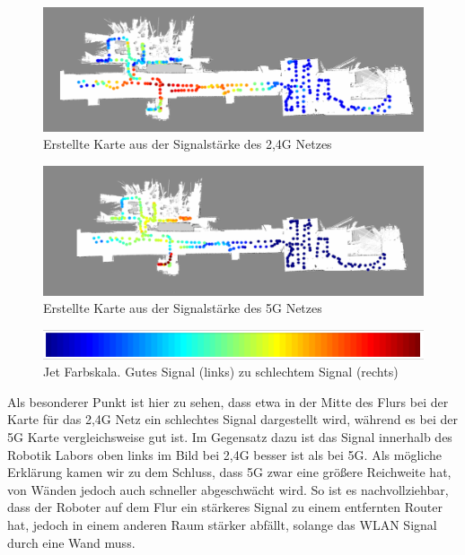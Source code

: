 \documentclass{scrartcl}%
\begin{document}
\begin{figure}[h!]
	\centering
	\includegraphics[width=\textwidth]{bilder/wlan-heatmap-2G4.png}
	\caption{Erstellte Karte aus der Signalstärke des 2,4G Netzes}
	\label{2g4}
\end{figure}

\begin{figure}[h!]
	\centering
	\includegraphics[width=\textwidth]{bilder/wlan-heatmap-5G.png}
	\caption{Erstellte Karte aus der Signalstärke des 5G Netzes}
	\label{5g}
\end{figure}

\begin{figure}[h!]
	\centering
	\includegraphics[width=\textwidth]{bilder/JetFarbskala.png}
	\caption{Jet Farbskala. Gutes Signal (links) zu schlechtem Signal (rechts)}
	\label{skala}
\end{figure}

Als besonderer Punkt ist hier zu sehen, dass etwa in der Mitte des Flurs bei der Karte für das 2,4G Netz ein schlechtes Signal dargestellt wird, während es bei der 5G Karte vergleichsweise gut ist. Im Gegensatz dazu ist das Signal innerhalb des Robotik Labors oben links im Bild bei 2,4G besser ist als bei 5G. Als mögliche Erklärung kamen wir zu dem Schluss, dass 5G zwar eine größere Reichweite hat, von Wänden jedoch auch schneller abgeschwächt wird. So ist es nachvollziehbar, dass der Roboter auf dem Flur ein stärkeres Signal zu einem entfernten Router hat, jedoch in einem anderen Raum stärker abfällt, solange das WLAN Signal durch eine Wand muss.
\end{document}

